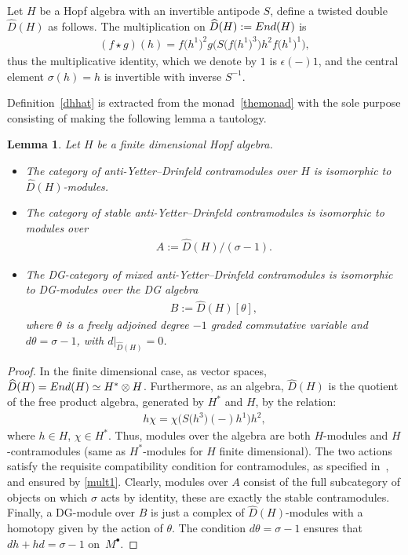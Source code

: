 \documentclass[11pt]{article}
\numberwithin{equation}{section}
\numberwithin{equation}{section}
\newtheorem{Lemma}[Theorem]{Lemma}
\newcommand{\ot}{\otimes}
\begin{document}
\begin{Definition}\label{dhhat}
Let $H$ be a Hopf algebra with an invertible antipode $S$, define a twisted double~$\widehat{D}(H)$ as follows. The multiplication on $\widehat{D}(H):={\rm End}(H)$ is
\begin{gather}\label{mult}
(f\star g)(h)= f\big(h^1\big)^2g\big(S\big(f\big(h^1\big)^3\big)h^2f\big(h^1\big)^1\big),
\end{gather}
thus the multiplicative identity, which we denote by $1$ is $\epsilon(-)1$, and the central element $\sigma(h)=h$ is invertible with inverse $S^{-1}$.
\end{Definition}

Definition~\ref{dhhat} is extracted from the monad~\eqref{themonad} with the sole purpose consisting of making the following lemma a tautology.

\begin{Lemma}\label{bas}
Let $H$ be a finite dimensional Hopf algebra.
\begin{itemize}\itemsep=0pt
\item The category of anti-Yetter--Drinfeld contramodules over $H$ is isomorphic to $\widehat{D}(H)$-mo\-dules.

\item The category of stable anti-Yetter--Drinfeld contramodules is isomorphic to modules over
\begin{gather}
A:=\widehat{D}(H)/(\sigma-1).
\end{gather}

\item The DG-category of mixed anti-Yetter--Drinfeld contramodules is isomorphic to DG-mo\-dules over the DG algebra
\begin{gather}
B:=\widehat{D}(H)[\theta],
\end{gather}
where $\theta$ is a freely adjoined degree $-1$ graded commutative variable and $d\theta=\sigma-1$, with $d|_{\widehat{D}(H)}=0$.
\end{itemize}
\end{Lemma}
\begin{proof}
In the finite dimensional case, as vector spaces, $\widehat{D}(H)={\rm End}(H)\simeq H^*\ot H$. Furthermore, as an algebra, $\widehat{D}(H)$ is the quotient of the free product algebra, generated by $H^*$ and $H$, by the relation:
\begin{gather}
\label{mult1}
h \chi= \chi\big(S\big(h^3\big)(-)h^1\big)h^2,
\end{gather}
where $h\in H$, $\chi\in H^*$. Thus, modules over the algebra are both $H$-modules and $H$-cont\-ra\-mo\-du\-les (same as $H^*$-modules for $H$ finite dimensional). The two actions satisfy the requisite compatibility condition for contramodules, as specified in~\cite{contra}, and ensured by \eqref{mult1}. Clearly, modules over $A$ consist of the full subcategory of objects on which $\sigma$ acts by identity, these are exactly the stable contramodules. Finally, a DG-module over $B$ is just a complex of $\widehat{D}(H)$-modules with a homotopy given by the action of $\theta$. The condition $d\theta=\sigma-1$ ensures that $dh+hd=\sigma-1$ on~$M^\bullet$.
\end{proof}
\end{document}
